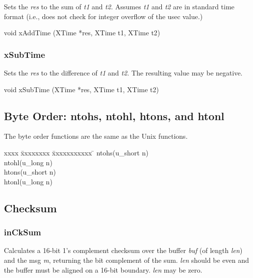 Sets the {\em res} to the sum of {\em t1} and {\em t2.}
Assumes {\em t1} and {\em t2} are in standard time format (i.e., does not
check for integer overflow of the usec value.)
\medskip

{\sem void} {\bold xAddTime} 
({\sem XTime} *{\caps res}, {\sem XTime} {\caps t1}, {\sem XTime} {\caps t2})


\subsubsection{xSubTime}

Sets the {\em res} to the difference of {\em t1} and {\em t2.}
The resulting value may be negative.
\medskip

{\sem void} {\bold xSubTime} 
({\sem XTime} *{\caps res}, {\sem XTime} {\caps t1}, {\sem XTime} {\caps t2})
\medskip




\subsection{Byte Order: ntohs, ntohl, htons, and htonl}

The byte order functions are the same as the Unix functions.
\medskip

\begin{tabbing}
xxxx \= xxxxxxxx \= xxxxxxxxxxx \= \kill
{} {\bold ntohs}({\sem u\_short} {\caps n})\\
 {\bold ntohl}({\sem u\_long} {\caps n})\\
 {\bold htons}({\sem u\_short} {\caps n})\\
 {\bold htonl}({\sem u\_long} {\caps n})\\
\end{tabbing}

\subsection{Checksum}

\subsubsection{inCkSum}

Calculates a 16-bit 1's complement checksum over the buffer
{\em *buf} (of length {\em len}) and the msg {\em *m}, returning the bit
complement of the sum.  {\em len} should be even and the buffer must be
aligned on a 16-bit boundary.  {\em len} may be zero.
\medskip

